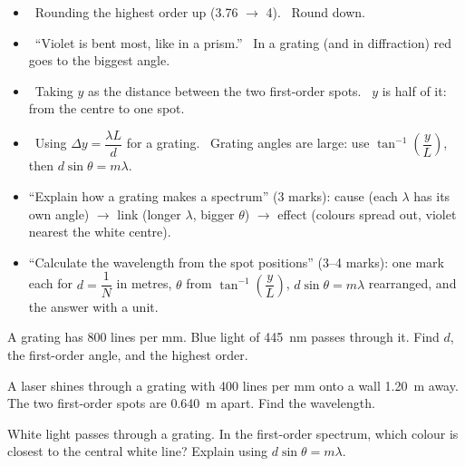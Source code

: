 \begin{mistakes}
\begin{itemize}
  \item \xmark\ Rounding the highest order up (3.76 $\to$ 4). \cmark\ Round down.
  \item \xmark\ ``Violet is bent most, like in a prism.'' \cmark\ In a grating (and in
        diffraction) red goes to the biggest angle.
  \item \xmark\ Taking $y$ as the distance between the two first-order spots. \cmark\ $y$
        is half of it: from the centre to one spot.
  \item \xmark\ Using $\Delta y = \dfrac{\lambda L}{d}$ for a grating. \cmark\ Grating angles
        are large: use $\tan^{-1}\!\left(\dfrac{y}{L}\right)$, then $d\sin\theta = m\lambda$.
\end{itemize}
\end{mistakes}

\begin{examtip}
\begin{itemize}
  \item ``Explain how a grating makes a spectrum'' (3 marks): cause (each $\lambda$ has
        its own angle) $\to$ link (longer $\lambda$, bigger $\theta$) $\to$ effect (colours
        spread out, violet nearest the white centre).
  \item ``Calculate the wavelength from the spot positions'' (3--4 marks): one mark each
        for $d = \dfrac{1}{N}$ in metres, $\theta$ from $\tan^{-1}\!\left(\dfrac{y}{L}\right)$,
        $d\sin\theta = m\lambda$ rearranged, and the answer with a unit.
\end{itemize}
\end{examtip}

\begin{quickcheck}
  \item A grating has 800 lines per mm. Blue light of \qty{445}{nm} passes through it.
        Find $d$, the first-order angle, and the highest order.
  \item A laser shines through a grating with 400 lines per mm onto a wall \qty{1.20}{m}
        away. The two first-order spots are \qty{0.640}{m} apart. Find the wavelength.
  \item White light passes through a grating. In the first-order spectrum, which colour is
        closest to the central white line? Explain using $d\sin\theta = m\lambda$.
\end{quickcheck}

